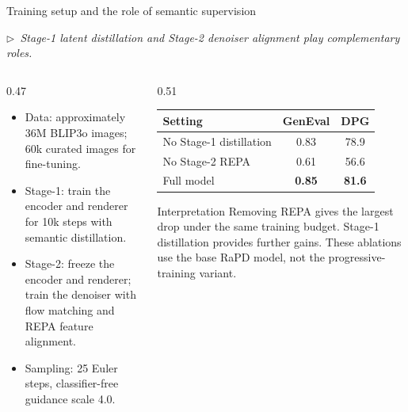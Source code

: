 \documentclass[aspectratio=169,10pt]{beamer}
\newcommand{\story}[1]{%
  {\color{rapdgray}\itshape\footnotesize $\triangleright$~#1\par}\vspace{0.3em}}
\begin{document}
\begin{frame}{Training setup and the role of semantic supervision}
  \story{Stage-1 latent distillation and Stage-2 denoiser alignment play complementary roles.}
  \begin{columns}[T,onlytextwidth]
  \begin{column}{0.47\textwidth}
  \footnotesize
  \begin{itemize}
    \item Data: approximately 36M BLIP3o images; 60k curated images for fine-tuning.
    \item Stage-1: train the encoder and renderer for 10k steps with semantic distillation.
    \item Stage-2: freeze the encoder and renderer; train the denoiser with flow matching and REPA feature alignment.
    \item Sampling: 25 Euler steps, classifier-free guidance scale 4.0.
  \end{itemize}
  \end{column}
  \begin{column}{0.51\textwidth}
  \scriptsize
  \begin{tabular}{lcc}
  \toprule
  Setting & GenEval & DPG \\
  \midrule
  No Stage-1 distillation & 0.83 & 78.9 \\
  No Stage-2 REPA & 0.61 & 56.6 \\
  \rowcolor{lightbluepurple}
  Full model & \textbf{0.85} & \textbf{81.6} \\
  \bottomrule
  \end{tabular}
  \vspace{1em}
  \begin{block}{Interpretation}
  Removing REPA gives the largest drop under the same training budget. Stage-1 distillation provides further gains. These ablations use the base RaPD model, not the progressive-training variant.
  \end{block}
  \end{column}
  \end{columns}
\end{frame}
\end{document}
